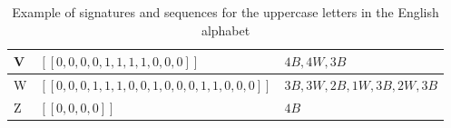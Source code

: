 \begin{table}[ht]
\begin{tabular}{|l|l|l|}
        V                     & $[[0, 0, 0, 0, 1, 1, 1, 1, 0, 0, 0]]$                   & $4B, 4W, 3B$                 \\ \hline
        W                     & $[[0, 0, 0, 1, 1, 1, 0, 0, 1, 0, 0, 0, 1, 1, 0, 0, 0]]$ & $3B, 3W, 2B, 1W, 3B, 2W, 3B$ \\ \hline
        Z                     & $[[0, 0, 0, 0]]$                                        & $4B$                         \\ \hline
    \end{tabular}
    \label{table:signature_sequence_example}
    \caption{Example of signatures and sequences for the uppercase letters in the English alphabet}
\end{table}